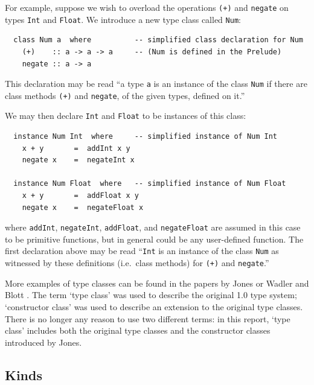 For example, suppose we wish to overload the operations \mbox{\tt (+)} and
\mbox{\tt negate} on types \mbox{\tt Int} and \mbox{\tt Float}.  We introduce a new
type class called \mbox{\tt Num}:\nopagebreak[4]
\par
{\small
\bprog
{\small\begin{verbatim}
  class Num a  where          -- simplified class declaration for Num
    (+)    :: a -> a -> a     -- (Num is defined in the Prelude)
    negate :: a -> a
\end{verbatim}}
\eprog
}
This declaration may be read ``a type \mbox{\tt a} is an instance of the class
\mbox{\tt Num} if there are class methods \mbox{\tt (+)} and \mbox{\tt negate}, of the
given types, defined on it.''

We may then declare \mbox{\tt Int} and \mbox{\tt Float} to be instances of this class:
\bprog
{\small\begin{verbatim}
  instance Num Int  where     -- simplified instance of Num Int
    x + y       =  addInt x y
    negate x    =  negateInt x
  
  instance Num Float  where   -- simplified instance of Num Float
    x + y       =  addFloat x y
    negate x    =  negateFloat x
\end{verbatim}}
\eprog
where \mbox{\tt addInt}, \mbox{\tt negateInt}, \mbox{\tt addFloat}, and \mbox{\tt negateFloat} are assumed
in this case to be primitive functions, but in general could be any
user-defined function.  The first declaration above may be read
``\mbox{\tt Int} is an instance of the class \mbox{\tt Num} as witnessed by these
definitions (i.e.~class methods) for \mbox{\tt (+)} and \mbox{\tt negate}.''

More examples of type classes can be found in
the papers by Jones \cite{jones:cclasses} or Wadler and Blott
\cite{wadler:classes}. 
The term `type class' was used to describe the original \Haskell{} 1.0
type system; `constructor class' was used to describe an extension to
the original type classes.  There is no longer any reason to use two
different terms: in this report, `type class' includes both the
original \Haskell{} type classes and the constructor classes
introduced by Jones.

\subsection{Kinds}

